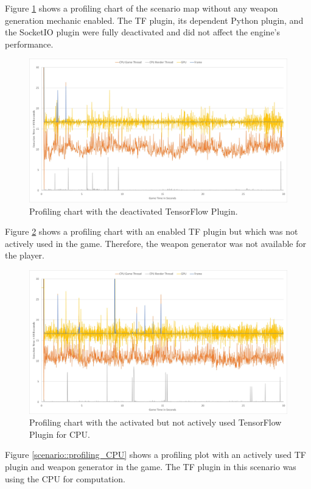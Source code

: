 \documentclass[MGS,Master,english]{twbook}%
\begin{document}
Figure \ref{scenario::profiling_noTF} shows a profiling chart of the scenario map without any weapon generation mechanic enabled. The TF plugin, its dependent Python plugin, and the SocketIO plugin were fully deactivated and did not affect the engine’s performance.
\begin{figure}[!ht]
	\centering
	\includegraphics[width=1.0\linewidth]{PICs/Profiling/deactivated_plugin}
	\caption{Profiling chart with the deactivated TensorFlow Plugin.} \label{scenario::profiling_noTF}
\end{figure}
Figure \ref{scenario::profiling_TF} shows a profiling chart with an enabled TF plugin but which was not actively used in the game. Therefore, the weapon generator was not available for the player.
\begin{figure}[!ht]
	\centering
	\includegraphics[width=1.0\linewidth]{PICs/Profiling/activated_plugin_no_tf_used}
	\caption{Profiling chart with the activated but not actively used TensorFlow Plugin for CPU.} \label{scenario::profiling_TF}
\end{figure}
Figure \ref{scenario::profiling_CPU} shows a profiling plot with an actively used TF plugin and weapon generator in the game. The TF plugin in this scenario was using the CPU for computation. 
\end{document}
